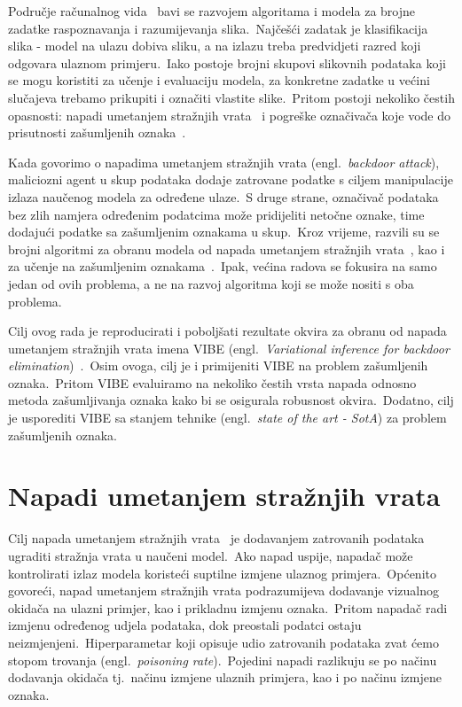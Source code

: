 \documentclass[diplomskirad]{fer}
\begin{document}
Područje računalnog vida~\cite{voulodimos2018deep} bavi se razvojem algoritama i modela za brojne zadatke raspoznavanja i razumijevanja slika.\ Najčešći zadatak je klasifikacija slika - model na ulazu dobiva sliku, a na izlazu treba predvidjeti razred koji odgovara ulaznom primjeru.\ 
Iako postoje brojni skupovi slikovnih podataka koji se mogu koristiti za učenje i evaluaciju modela, za konkretne zadatke u većini slučajeva trebamo prikupiti i označiti vlastite slike.\ 
Pritom postoji nekoliko čestih opasnosti: napadi umetanjem stražnjih vrata~\cite{gao2020backdoor} i pogreške označivača koje vode do prisutnosti zašumljenih oznaka~\cite{gupta2019dealing}.\ 

\pagebreak

Kada govorimo o napadima umetanjem stražnjih vrata (engl.\ \textit{backdoor attack}), maliciozni agent u skup podataka dodaje zatrovane podatke s ciljem manipulacije izlaza naučenog modela za određene ulaze.\ 
S druge strane, označivač podataka bez zlih namjera određenim podatcima može pridijeliti netočne oznake, time dodajući podatke sa zašumljenim oznakama u skup.\ 
Kroz vrijeme, razvili su se brojni algoritmi za obranu modela od napada umetanjem stražnjih vrata~\cite{li2021anti, huang2022backdoor, gao2023backdoor}, kao i za učenje na zašumljenim oznakama~\cite{liu2022robust, chen2024imprecise}.\ Ipak, većina radova se fokusira na samo jedan od ovih problema, a ne na razvoj algoritma koji se može nositi s oba problema.\ 
  
Cilj ovog rada je reproducirati i poboljšati rezultate okvira za obranu od napada umetanjem stražnjih vrata imena VIBE (engl.\ \textit{Variational inference for backdoor elimination})~\cite{sabolic2025seal}.\ 
Osim ovoga, cilj je i primijeniti VIBE na problem zašumljenih oznaka.\ Pritom VIBE evaluiramo na nekoliko čestih vrsta napada odnosno metoda zašumljivanja oznaka kako bi se osigurala robusnost okvira.\ 
Dodatno, cilj je usporediti VIBE sa stanjem tehnike (engl.\ \textit{state of the art - SotA}) za problem zašumljenih oznaka.\

\chapter{Napadi umetanjem stražnjih vrata}
\label{pog:napadi}

Cilj napada umetanjem stražnjih vrata~\cite{gao2020backdoor} je dodavanjem zatrovanih podataka ugraditi stražnja vrata u naučeni model.\ Ako napad uspije, napadač može kontrolirati izlaz modela koristeći suptilne izmjene ulaznog primjera.\ 
Općenito govoreći, napad umetanjem stražnjih vrata podrazumijeva dodavanje vizualnog okidača na ulazni primjer, kao i prikladnu izmjenu oznaka.\ Pritom napadač radi izmjenu određenog udjela podataka, dok preostali podatci ostaju neizmjenjeni.\ 
Hiperparametar koji opisuje udio zatrovanih podataka zvat ćemo stopom trovanja (engl.\ \textit{poisoning rate}).\ Pojedini napadi razlikuju se po načinu dodavanja okidača tj.\ načinu izmjene ulaznih primjera, kao i po načinu izmjene oznaka.\ 
  
\end{document}
